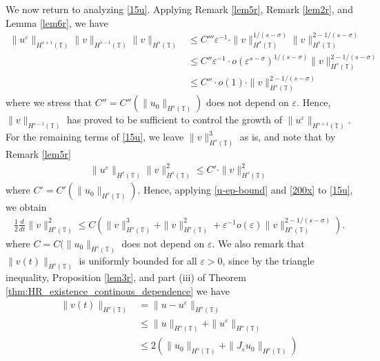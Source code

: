 \documentclass[12pt,reqno]{amsart}
\newcommand{\ci}{\mathbb{T}}
\newcommand{\ee}{\varepsilon}
\theoremstyle{plain}  %
\theoremstyle{definition}
\begin{document}
\begin{appendices}
%
%
%
%
%
%
%
%
\vskip0.1in
We now return to analyzing
\eqref{15u}. Applying Remark \ref{lem5r}, Remark \ref{lem2r}, and Lemma
\ref{lem6r}, we have
\begin{equation}
	\begin{split}
		\label{200x}
		\|u^\ee \|_{H^{s+1}(\ci)} \|v \|_{H^{s-1}(\ci)} \|v\|_{H^s(\ci)}
		& \le C''' \ee^{-1} \cdot \|v\|_{H^\sigma(\ci)}^{1/(s-\sigma)}
		\|v\|_{H^s(\ci)}^{2 - 1/(s- \sigma)}
		\\
		& \le C'' \ee^{-1} \cdot o(\ee^{s- \sigma})^{1/(s-\sigma)}
		\|v\|_{H^s(\ci)}^{2- 1/(s-\sigma)}
		\\
		& \le C'' \cdot o(1) \cdot \|v\|_{H^s(\ci)}^{2- 1/(s-\sigma)}
	\end{split}
\end{equation}
where we stress that $C'' = C''(\|u_0\|_{H^s(\ci)})$ does not depend on $\ee$.
Hence, $\|v\|_{H^{s-1}(\ci)}$ has proved to be sufficient to control the
growth of $\|u^\ee \|_{H^{s+1}(\ci)}$. For the remaining terms of
\eqref{15u}, we leave $\|v\|_{H^s(\ci)}^3$ as is, and note that by Remark \ref{lem5r}
\begin{equation}
	\begin{split}
		\|u^\ee\|_{H^s(\ci)} \|v\|_{H^s(\ci)}^2 \le C'
		\cdot \|v\|_{H^s(\ci)}^2
		\label{u-ep-bound}
	\end{split}
\end{equation}
where $C' = C'(\|u_0\|_{H^s(\ci)})$. Hence, applying \eqref{u-ep-bound} and \eqref{200x} to \eqref{15u}, we obtain
\begin{equation}
	\begin{split}
		\frac{1}{2} \frac{d}{dt} \|v\|_{H^s(\ci)}^2 \le C (
		\|v\|_{H^s(\ci)}^3 + \|v\|_{H^s(\ci)}^2 + \ee ^{-1} o(\ee) \|v\|_{H^s(\ci)}^{2-
		1/(s- \sigma)}).
		\label{201x}
	\end{split}
\end{equation}
where $C=C(\|u_0\|_{H^s(\ci)}$ does not depend on $\ee$. We also remark 
that $\|v(t)\|_{H^s(\ci)}$ is uniformly bounded for all $\ee > 0$, since by
the triangle inequality, Proposition \ref{lem3r}, and part (iii) of Theorem
\ref{thm:HR_existence_continous_dependence} we have
\begin{equation*}
	\begin{split}
		\|v(t) \|_{H^s(\ci)}
		& = \|u - u^\ee \|_{H^s(\ci)}
		\\
		& \le \|u \|_{H^s(\ci)} + \|u^\ee \|_{H^s(\ci)}
		\\
		& \le 2( \|u_0\|_{H^s(\ci)} + \|J_\ee u_0\|_{H^s(\ci)})
		\\

\end{split}
\end{equation*}
\end{appendices}
\end{document}
